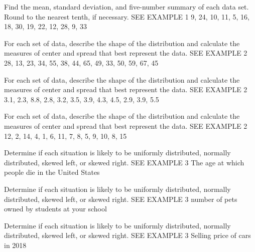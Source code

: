\documentclass{article}
\newenvironment{practice}[2]{}{}        %
\newcommand{\answer}[1]{}               %
\begin{document}
\begin{practice}{14}{1}
Find the mean, standard deviation, and five-number summary of each data set. Round to the nearest tenth, if necessary. SEE EXAMPLE 1
9, 24, 10, 11, 5, 16, 18, 30, 19, 22, 12, 28, 9, 33
\answer{mean: 17.6; standard deviation: 8.5; minimum: 5; first quartile: 10; median: 17; third quartile: 24; and maximum: 33}
\end{practice}
\begin{practice}{15}{1}
For each set of data, describe the shape of the distribution and calculate the measures of center and spread that best represent the data. SEE EXAMPLE 2
28, 13, 23, 34, 55, 38, 44, 65, 49, 33, 50, 59, 67, 45
\answer{Normal distribution, so the mean and standard deviation best represent the data set; mean: 43.1; standard deviation: 15.3}
\end{practice}
\begin{practice}{16}{1}
For each set of data, describe the shape of the distribution and calculate the measures of center and spread that best represent the data. SEE EXAMPLE 2
3.1, 2.3, 8.8, 2.8, 3.2, 3.5, 3.9, 4.3, 4.5, 2.9, 3.9, 5.5
\answer{Skewed right, so median and interquartile range best represent the data set; median: 3.7; interquartile range: 1.4}
\end{practice}
\begin{practice}{17}{1}
For each set of data, describe the shape of the distribution and calculate the measures of center and spread that best represent the data. SEE EXAMPLE 2
12, 2, 14, 4, 1, 6, 11, 7, 8, 5, 9, 10, 8, 15
\answer{Normal distribution, so the mean and standard deviation best represent the set; mean: 8; standard deviation: 4.1}
\end{practice}
\begin{practice}{18}{1}
Determine if each situation is likely to be uniformly distributed, normally distributed, skewed left, or skewed right. SEE EXAMPLE 3
The age at which people die in the United States
\answer{skewed left}
\end{practice}
\begin{practice}{19}{1}
Determine if each situation is likely to be uniformly distributed, normally distributed, skewed left, or skewed right. SEE EXAMPLE 3
number of pets owned by students at your school
\answer{skewed right}
\end{practice}
\begin{practice}{20}{1}
Determine if each situation is likely to be uniformly distributed, normally distributed, skewed left, or skewed right. SEE EXAMPLE 3
Selling price of cars in 2018
\answer{skewed right}
\end{practice}
\end{document}
